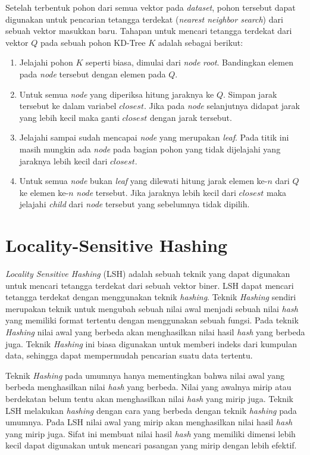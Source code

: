 Setelah terbentuk pohon dari semua vektor pada \textit{dataset}, pohon tersebut dapat digunakan untuk pencarian tetangga terdekat (\textit{nearest neighbor search}) dari sebuah vektor masukkan baru. Tahapan untuk mencari tetangga terdekat dari vektor $Q$ pada sebuah pohon KD-Tree $K$ adalah sebagai berikut:
\begin{enumerate}
	\item Jelajahi pohon $K$ seperti biasa, dimulai dari \textit{node} \textit{root}. Bandingkan elemen pada \textit{node} tersebut dengan elemen pada $Q$. 
	\item Untuk semua \textit{node} yang diperiksa hitung jaraknya ke $Q$. Simpan jarak tersebut ke dalam variabel $closest$. Jika pada \textit{node} selanjutnya didapat jarak yang lebih kecil maka ganti $closest$ dengan jarak tersebut.
	\item Jelajahi sampai sudah mencapai \textit{node} yang merupakan \textit{leaf}. Pada titik ini masih mungkin ada \textit{node} pada bagian pohon yang tidak dijelajahi yang jaraknya lebih kecil dari $closest$.
	\item Untuk semua \textit{node} bukan \textit{leaf} yang dilewati hitung jarak elemen ke-$n$ dari $Q$ ke elemen ke-$n$ \textit{node} tersebut. Jika jaraknya lebih kecil dari $closest$ maka jelajahi \textit{child} dari \textit{node} tersebut yang sebelumnya tidak dipilih.
\end{enumerate}

\section{Locality-Sensitive Hashing}
\textit{Locality Sensitive Hashing} (LSH) adalah sebuah teknik yang dapat digunakan untuk mencari tetangga terdekat dari sebuah vektor biner. LSH dapat mencari tetangga terdekat dengan menggunakan teknik \textit{hashing}. Teknik \textit{Hashing} sendiri merupakan teknik untuk mengubah sebuah nilai awal menjadi sebuah nilai \textit{hash} yang memiliki format tertentu dengan menggunakan sebuah fungsi. Pada teknik \textit{Hashing} nilai awal yang berbeda akan menghasilkan nilai hasil \textit{hash} yang berbeda juga. Teknik \textit{Hashing} ini biasa digunakan untuk memberi indeks dari kumpulan data, sehingga dapat mempermudah pencarian suatu data tertentu.

Teknik \textit{Hashing} pada umumnya hanya mementingkan bahwa nilai awal yang berbeda menghasilkan nilai \textit{hash} yang berbeda. Nilai yang awalnya mirip atau berdekatan belum tentu akan menghasilkan nilai \textit{hash} yang mirip juga. Teknik LSH melakukan \textit{hashing} dengan cara yang berbeda dengan teknik \textit{hashing} pada umumnya. Pada LSH nilai awal yang mirip akan menghasilkan nilai hasil \textit{hash} yang mirip juga. Sifat ini membuat nilai hasil \textit{hash} yang memiliki dimensi lebih kecil dapat digunakan untuk mencari pasangan yang mirip dengan lebih efektif.

